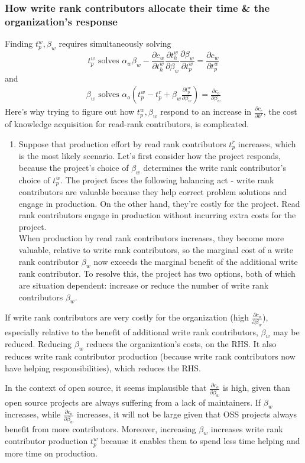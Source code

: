 \documentclass[source/paper/main.tex]{subfiles}
\begin{document}
\subsubsection{How write rank contributors allocate their time \& the organization's response}
Finding $t_p^w, \beta_w$ requires simultaneously solving 
$$t_p^w \text{ solves } \alpha_w \beta_w - \frac{\partial c_w}{\partial t_h^w} \frac{\partial t_h^w}{\partial \beta_w}\frac{\partial \beta_w}{\partial t_p^w} = \frac{\partial c_w}{\partial t_p^w} $$
and
\begin{align}
    \beta_w \text{ solves } \alpha_o(t_p^w- t_p^r + \beta_w \frac{\partial t_p^w}{\partial \beta_w} ) = \frac{\partial c_o}{\partial \beta_w} 
\end{align}
Here's why trying to figure out how $t_p^w, \beta_w$ respond to an increase in $\frac{\partial c_r}{\partial k^r}$, the cost of knowledge acquisition for read-rank contributors, is complicated. 
\begin{enumerate}
    \item  Suppose that production effort by read rank contributors $t_p^r$ increases, which is the most likely scenario. Let's first consider how the project responds, because the project's choice of $\beta_w$ determines the write rank contributor's choice of $t_p^w$. The project faces the following balancing act - write rank contributors are valuable because they help correct problem solutions and engage in production. On the other hand, they're costly for the project. Read rank contributors engage in production without incurring extra costs for the project. \\
    When production by read rank contributors increases, they become more valuable, relative to write rank contributors, so the marginal cost of a write rank contributor $\beta_w$ now exceeds the marginal benefit of the additional write rank contributor. To resolve this, the project has two options, both of which are situation dependent: increase or reduce the number of write rank contributors $\beta_w$. 
\end{enumerate}
If write rank contributors are very costly for the organization (high $\frac{\partial c_o}{\partial \beta_w}$), especially relative to the benefit of additional write rank contributors, $\beta_w$ may be reduced. Reducing $\beta_w$ reduces the organization's costs, on the RHS. It also reduces write rank contributor production (because write rank contributors now have helping responsibilities), which reduces the RHS. 

In the context of open source, it seems implausible that $\frac{\partial c_o}{\partial \beta_w}$ is high, given than open source projects are always suffering from a lack of maintainers. If $\beta_w$ increases, while $\frac{\partial c_o}{\partial \beta_w}$ increases, it will not be large given that OSS projects always benefit from more contributors. Moreover, increasing $\beta_w$ increases write rank contributor production $t_p^w$ because it enables them to spend less time helping and more time on production. 
\end{document}
